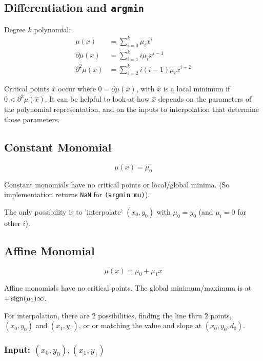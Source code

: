 \subsection{Differentiation and \texttt{argmin}}

Degree $k$ polynomial:
\begin{align}
\mu(x) & = \sum_{i=0}^{k} \mu_i x^i
\\
\partial{\mu}(x) & = \sum_{i=1}^{k} i \mu_i x^{i-1}
\nonumber
\\
\partial^2{\mu}(x) & = \sum_{i=2}^{k} i (i-1) \mu_i x^{i-2}
\nonumber
\end{align}

Critical points $\hat{x}$ occur where 
$ 0 = \partial{\mu}(\hat{x}) $,
with $\hat{x}$ is a local minimum if 
$ 0 < \partial^2{\mu}(\hat{x}) $.
It can be helpful to look at how $\hat{x}$ depends
on the parameters of the polynomial representation,
and on the inputs to interpolation that determine those 
parameters.

\subsection{Constant Monomial}

\begin{equation}
\mu(x) = \mu_0
\end{equation}

Constant monomials have no critical points or local/global
minima. 
(So implementation returns \texttt{NaN} for \texttt{(argmin mu)}).

The only possibility is to 'interpolate' $(x_0,y_0)$ with
$\mu_0 = y_0$ (and $\mu_i = 0$ for other $i$). 

\subsection{Affine Monomial}

\begin{equation}
\mu(x) = \mu_0 + \mu_1 x
\end{equation}

Affine monomials have no critical points.
The global minimum/maximum is at $\mp \operatorname*{sign}(\mu_1) \infty$.

For interpolation, there are $2$ possibilities, finding the line thru $2$
points, $(x_0,y_0)$ and $(x_1,y_1)$, or or matching the value and slope at
$(x_0,y_0,d_0)$.

\subsubsection{Input: $(x_0,y_0),(x_1,y_1)$}

